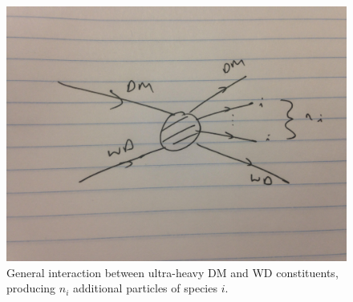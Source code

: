 \documentclass[11 pt,preprint,preprintnumbers,amsmath,amssymb, prd]{revtex4}
\begin{document}
\begin{figure}
\label{fig:feynmandiag}
\includegraphics[scale=.05]{feynmandiag}
\caption{General interaction between ultra-heavy DM and WD constituents, producing $n_i$ additional particles of species $i$.}
\end{figure}
\end{document}

